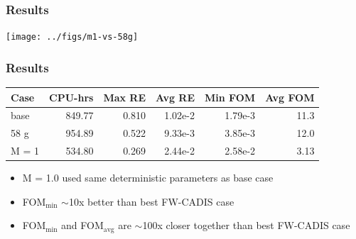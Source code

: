 \documentclass[xcolor=x11names,compress, handout]{beamer}
\renewcommand{\(}{\begin{columns}}
\renewcommand{\)}{\end{columns}}
\newcommand{\<}[1]{\begin{column}{#1}}
\renewcommand{\>}{\end{column}}
\begin{document}
\begin{frame}[fragile]
  \frametitle{Results}
    \begin{center}
  \texttt{[image: ../figs/m1-vs-58g]}  
  \end{center}
\end{frame}


\begin{frame}[fragile]
  \frametitle{Results}

	\begin{table}[p]
 	 \label{tab:comparison}
  	\begin{center}
    \begin{tabular}{|l|r|r|r|r|r|}\hline
      Case & CPU-hrs & Max RE & Avg RE & Min FOM & Avg FOM\\\hline
base & 849.77 & 0.810 & 1.02e-2 & 1.79e-3 & 11.3\\
%
58 g & 954.89 & 0.522 & 9.33e-3 & 3.85e-3 & 12.0\\
%
M = 1 & \alert{534.80} & 0.269 & 2.44e-2 & \alert{2.58e-2} & 3.13\\\hline
    \end{tabular}
 	 \end{center}
	\end{table}

	\begin{itemize}
	\item M = 1.0 used same deterministic parameters as base case
	\item FOM$_{\min}$ $\sim$10x better than best FW-CADIS case
	\item FOM$_{\min}$ and FOM$_{\text{avg}}$ are $\sim$100x closer together than best FW-CADIS case
	\end{itemize}

\end{frame}
\end{document}
